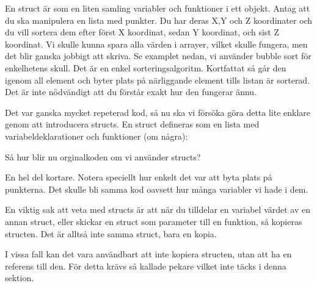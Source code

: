 En struct är som en liten samling variabler och funktioner i ett objekt.
Antag att du ska manipulera en lista med punkter. Du har deras X,Y och Z koordinater och du vill
sortera dem efter först X koordinat, sedan Y koordinat, och sist Z koordinat.
Vi skulle kunna spara alla värden i arrayer, vilket skulle fungera, men det blir ganska jobbigt att skriva.
Se examplet nedan, vi använder bubble sort för enkelhetens skull. Det är en enkel sorteringsalgoritm. Kortfattat så går den igenom all element och byter plats på närliggande element tills listan är sorterad. Det är inte nödvändigt att du förstår exakt hur den fungerar ännu.



Det var ganska mycket repeterad kod, så nu ska vi försöka göra detta lite enklare genom att introducera structs.
En struct defineras som en lista med variabeldeklarationer och funktioner (om några):



Så hur blir nu orginalkoden om vi använder structs?



En hel del kortare. Notera speciellt hur enkelt det var att byta plats på punkterna. Det skulle bli samma kod oavsett hur många variabler vi hade i dem.

En viktig sak att veta med structs är att när du tilldelar en variabel värdet av en annan struct, eller skickar en struct som parameter till en funktion, så kopieras structen. Det är alltså inte samma struct, bara en kopia.



I vissa fall kan det vara användbart att inte kopiera structen, utan att ha en referens till den. För detta krävs så kallade pekare vilket inte täcks i denna sektion.